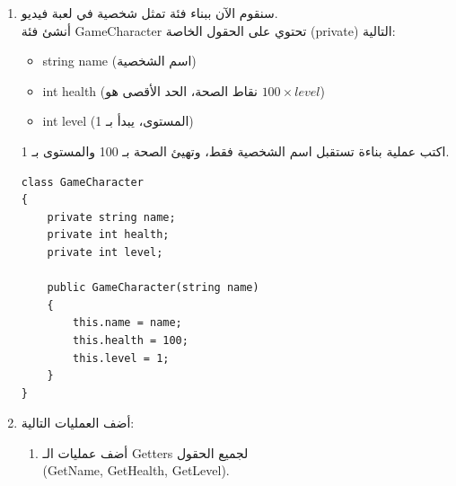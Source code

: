 \documentclass[14pt]{extarticle}
\begin{document}
\begin{enumerate}[itemsep=2em]
    \ifwithsols
    \begin{boxSolution}
    \begin{english}
    \begin{verbatim}
public void IncrementTime(int addedSeconds)
{
    int totalSeconds = ToSeconds() + addedSeconds;

    // Calculate new time
    this.hours = (totalSeconds / 3600) % 24;
    this.minutes = (totalSeconds % 3600) / 60;
    this.seconds = totalSeconds % 60;
}
    \end{verbatim}
    \end{english}
    \end{boxSolution}
    \fi
    \clearpage

    \item
    سنقوم الآن ببناء فئة تمثل شخصية في لعبة فيديو.\\
    أنشئ فئة \textenglish{GameCharacter} تحتوي على الحقول الخاصة (\textenglish{private}) التالية:
    \begin{itemize}
        \item \textenglish{string name} (اسم الشخصية)
        \item \textenglish{int health} (نقاط الصحة، الحد الأقصى هو $100 \times level$)
        \item \textenglish{int level} (المستوى، يبدأ بـ 1)
    \end{itemize}
    اكتب عملية بناءة تستقبل اسم الشخصية فقط، وتهيئ الصحة بـ 100 والمستوى بـ 1.

    \ifwithsols
    \begin{boxSolution}
    \begin{english}
    \begin{verbatim}
class GameCharacter
{
    private string name;
    private int health;
    private int level;

    public GameCharacter(string name)
    {
        this.name = name;
        this.health = 100;
        this.level = 1;
    }
}
    \end{verbatim}
    \end{english}
    \end{boxSolution}
    \clearpage
    \fi

    \item أضف العمليات التالية:
    \begin{enumerate} [itemsep=1em]
    \item أضف عمليات الـ \textenglish{Getters} لجميع الحقول \\
    (\textenglish{GetName, GetHealth, GetLevel}).


\end{enumerate}
\end{enumerate}
\end{document}
